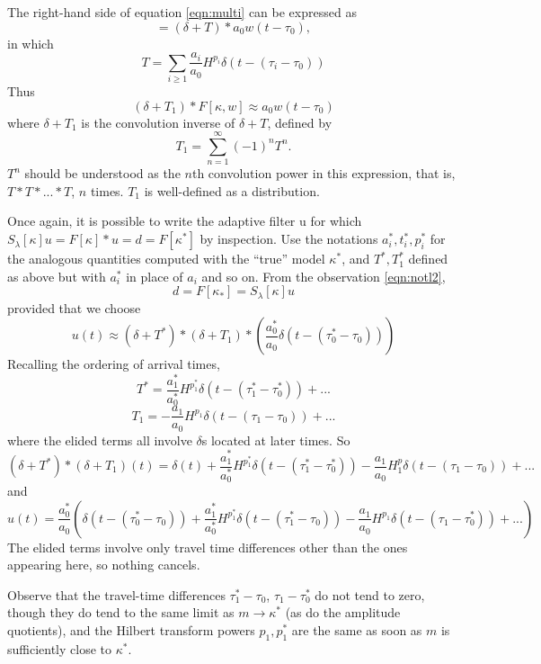 The right-hand side of equation \ref{eqn:multi} can be expressed as
\[
  = (\delta + T) * a_0w(t-\tau_0),
\]
in which 
\[
  T = \sum_{i \ge 1}
  \frac{a_i}{a_0}H^{p_i}\delta(t-(\tau_i-\tau_0))
\]
Thus
\begin{equation}
  \label{eqn:unwrap}
  (\delta +T_1) * F[\kappa,w] \approx  a_0w(t-\tau_0)
\end{equation}
where $\delta + T_1$ is the convolution inverse of $\delta + T$,
defined by 
\[
  T_1 = \sum_{n=1}^{\infty} (-1)^n T^n.
\]
$T^n$ should be understood as the $n$th convolution power in this
expression, that is, $T*T*...*T$, $n$ times. $T_1$ is well-defined as a distribution.

Once again, it is possible to write the adaptive filter u for which $S_{\lambda}[\kappa]u = F[\kappa]*u = d =
F[\kappa^*]$ by inspection. Use the notations $a^*_i, t^*_i, p^*_i$ for
the analogous quantities computed with the ``true'' model $\kappa^*$, and
$T^*, T_1^*$ defined as above but with $a^*_i$ in place of $a_i$ and so
on. From the observation \ref{eqn:notl2},
\[
  d = F[\kappa_*]= S_{\lambda}[\kappa] u
\]
provided that we choose
\begin{equation}
  \label{eqn:notl2again}
u(t) \approx (\delta + T^*)*(\delta +
T_1)*\left(\frac{a^*_0}{a_0}\delta(t - (\tau^*_0-\tau_0))\right)
\end{equation}
Recalling the ordering of arrival times, 
\[
  T^* = \frac{a^*_1}{a^*_0}H^{p_1^*} \delta(t-(\tau^*_1-\tau^*_0)) + ...
\]
\[
  T_1 = -\frac{a_1}{a_0}H^{p_1} \delta(t-(\tau_1-\tau_0)) + ...
\]
where the elided terms all involve $\delta$s located at later times.
So
\[
  (\delta + T^*)*(\delta + T_1)(t) = \delta(t)  +  \frac{a^*_1}{a^*_0}
  H^{p_1^*}\delta(t-(\tau^*_1-\tau^*_0)) -\frac{a_1}{a_0}H^p_1
  \delta(t-(\tau_1-\tau_0)) + ...
\]
and
\begin{equation}
  \label{eqn:notl2explicit}
  u(t) = \frac{a^*_0}{a_0}\left(\delta(t - (\tau^*_0-\tau_0)) +
    \frac{a^*_1}{a^*_0}H^{p_1^*}\delta(t-(\tau^*_1-\tau_0)) -
    \frac{a_1}{a_0}H^{p_1}\delta(t-(\tau_1-\tau_0^*)) + ...\right)
\end{equation}
The elided terms involve only travel time differences other than the
ones appearing here, so nothing cancels.

Observe that the travel-time differences $\tau^*_1-\tau_0$,
$\tau_1-\tau_0^*$ do not tend to zero, though they do tend to the same
limit as $m \rightarrow \kappa^*$ (as do the amplitude quotients), and the
Hilbert transform powers $p_1, p_1^*$ are the same as soon as $m$ is
sufficiently close to $\kappa^*$.

